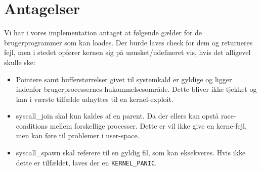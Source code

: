 \section{Antagelser}
Vi har i vores implementation antaget at følgende gælder for de brugerprogrammer
som kan loades. Der burde laves check for dem og returneres fejl, men i stedet
opfører kernen sig på uønsket/udefineret vis, hvis det alligevel skulle ske:

\begin{itemize}
\item Pointere samt bufferstørrelser givet til systemkald er gyldige og ligger indenfor
brugerprocessernes hukommelsesområde. Dette bliver ikke tjekket og kan i værste
tilfælde udnyttes til en kernel-exploit.
\item syscall\_join skal kun kaldes af en parent. Da der ellers kan opstå
race-conditions mellem forskellige processer. Dette er vil ikke give en
kerne-fejl, men kan føre til problemer i user-space.
\item syscall\_spawn skal referere til en gyldig fil, som kan eksekveres. Hvis ikke
dette er tilfældet, laves der en {\tt KERNEL\_PANIC}.
\end{itemize}


